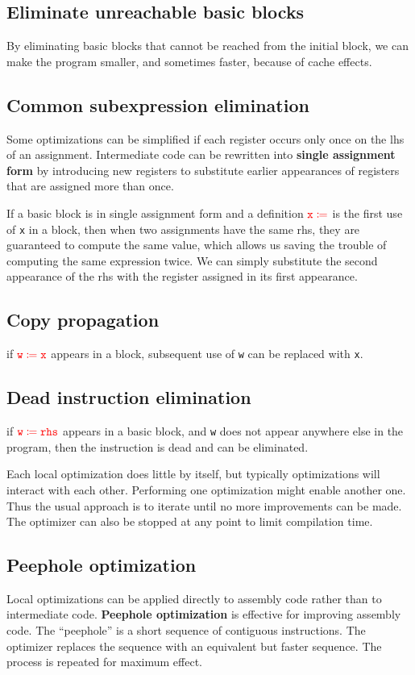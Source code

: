 \subsection{Eliminate unreachable basic blocks}
By eliminating basic blocks that cannot be reached from the initial block, we can make the program smaller, and sometimes faster, because of cache effects.
\subsection{Common subexpression elimination}
Some optimizations can be simplified if each register occurs only once on the lhs of an assignment. Intermediate code can be rewritten into \textbf{single assignment form} by introducing new registers to substitute earlier appearances of registers that are assigned more than once. 

If a basic block is in single assignment form and a definition $\color{red}\mathtt{x\coloneqq}$ is the first use of \texttt{x} in a block, then when two assignments have the same rhs, they are guaranteed to compute the same value, which allows us saving the trouble of computing the same expression twice. We can simply substitute the second appearance of the rhs with the register assigned in its first appearance.
\subsection{Copy propagation}
if $\color{red}\mathtt{w\coloneqq x}$ appears in a block, subsequent use of \texttt{w} can be replaced with \texttt{x}.
\subsection{Dead instruction elimination}
if $\color{red}\mathtt{w\coloneqq rhs}$ appears in a basic block, and \texttt{w} does not appear anywhere else in the program, then the instruction is dead and can be eliminated.

Each local optimization does little by itself, but typically optimizations will interact with each other. Performing one optimization might enable another one. Thus the usual approach is to iterate until no more improvements can be made. The optimizer can also be stopped at any point to limit compilation time. 
\subsection{Peephole optimization}
Local optimizations can be applied directly to assembly code rather than to intermediate code. \textbf{Peephole optimization} is effective for improving assembly code. The ``peephole'' is a short sequence of contiguous instructions. The optimizer replaces the sequence with an equivalent but faster sequence. The process is repeated for maximum effect.
